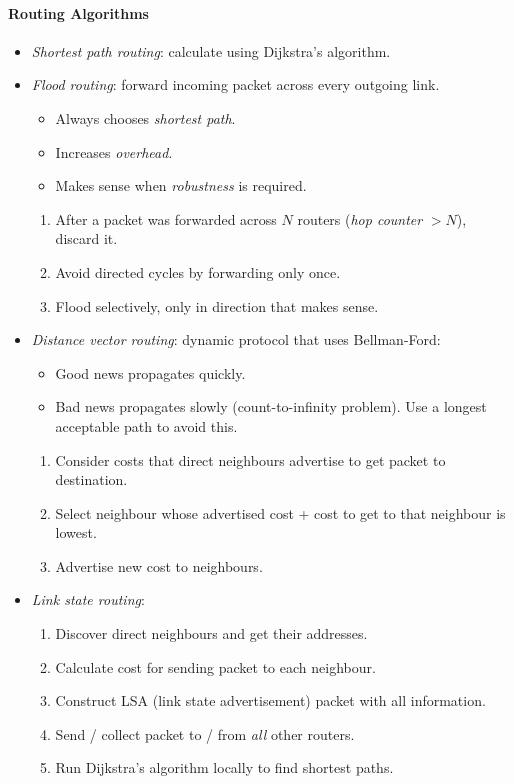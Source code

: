 \documentclass[twocolumn,english]{article}
\begin{document}
\paragraph{Routing Algorithms}
\begin{itemize}
\item \emph{Shortest path routing}: calculate using Dijkstra's algorithm.
\item \emph{Flood routing}: forward incoming packet across every outgoing
link.
\begin{itemize}
\item Always chooses \emph{shortest path}.
\item Increases \emph{overhead}.
\item Makes sense when \emph{robustness} is required.
\end{itemize}
\begin{enumerate}
\item After a packet was forwarded across $N$ routers (\emph{hop counter}
$>N$), discard it.
\item Avoid directed cycles by forwarding only once.
\item Flood selectively, only in direction that makes sense.
\end{enumerate}
\item \emph{Distance vector routing}: dynamic protocol that uses Bellman-Ford:
\begin{itemize}
\item Good news propagates quickly.
\item Bad news propagates slowly (count-to-infinity problem). Use a longest
acceptable path to avoid this.
\end{itemize}
\begin{enumerate}
\item Consider costs that direct neighbours advertise to get packet to destination.
\item Select neighbour whose advertised cost + cost to get to that neighbour
is lowest.
\item Advertise new cost to neighbours.
\end{enumerate}
\item \emph{Link state routing}:
\begin{enumerate}
\item Discover direct neighbours and get their addresses.
\item Calculate cost for sending packet to each neighbour.
\item Construct LSA (link state advertisement) packet with all information.
\item Send / collect packet to / from \emph{all} other routers.
\item Run Dijkstra's algorithm locally to find shortest paths.
\end{enumerate}
\end{itemize}
\end{document}
